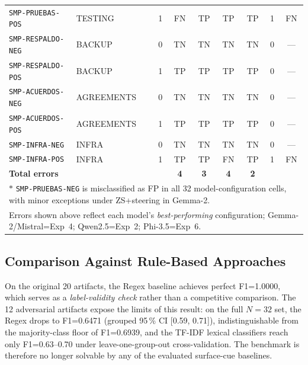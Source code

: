 \documentclass{ieeeaccess}
\begin{document}
\begin{table}[htbp]
{\begin{tabular}{|l|l|c|c|c|c|c|c|c|}
\texttt{SMP-PRUEBAS-POS}     & TESTING     & 1 & \cellcolor{orange!30}FN & TP & TP & TP & 1 & FN \\
\texttt{SMP-RESPALDO-NEG}    & BACKUP    & 0 & TN & TN & TN & TN & 0 & --- \\
\texttt{SMP-RESPALDO-POS}    & BACKUP    & 1 & TP & TP & TP & TP & 0 & --- \\
\texttt{SMP-ACUERDOS-NEG}    & AGREEMENTS    & 0 & TN & TN & TN & TN & 0 & --- \\
\texttt{SMP-ACUERDOS-POS}    & AGREEMENTS    & 1 & TP & TP & TP & TP & 0 & --- \\
\texttt{SMP-INFRA-NEG}       & INFRA       & 0 & TN & TN & TN & TN & 0 & --- \\
\texttt{SMP-INFRA-POS}       & INFRA       & 1 & TP & TP & \cellcolor{orange!30}FN & TP & 1 & FN \\
\hline
\multicolumn{3}{|l|}{\textbf{Total errors}} & \textbf{4} & \textbf{3} & \textbf{4} & \textbf{2} & & \\
\hline
\multicolumn{9}{l}{\footnotesize $*$ \texttt{SMP-PRUEBAS-NEG} is misclassified as FP in all 32 model-configuration cells, with minor exceptions under ZS+steering in Gemma-2.} \\
\multicolumn{9}{l}{\footnotesize Errors shown above reflect each model's \emph{best-performing} configuration; Gemma-2/Mistral=Exp~4; Qwen2.5=Exp~2; Phi-3.5=Exp~6.} \\
\end{tabular}
}
\end{table}

\FloatBarrier

\subsection{Comparison Against Rule-Based Approaches}

On the original 20 artifacts, the Regex baseline achieves perfect F1=1.0000, which serves as a \emph{label-validity check} rather than a competitive comparison. The 12 adversarial artifacts expose the limits of this result: on the full $N=32$ set, the Regex drops to F1=0.6471 (grouped 95\,\% CI [0.59, 0.71]), indistinguishable from the majority-class floor of F1=0.6939, and the TF-IDF lexical classifiers reach only F1=0.63--0.70 under leave-one-group-out cross-validation. The benchmark is therefore no longer solvable by any of the evaluated surface-cue baselines.
\end{document}
